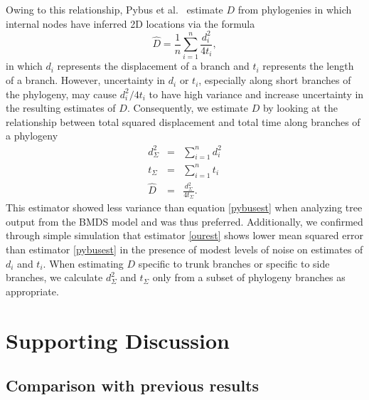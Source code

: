 \documentclass[11pt,oneside,letterpaper]{article}
\begin{document}
Owing to this relationship, Pybus et al.\ \cite{Pybus12} estimate $D$ from phylogenies in which internal nodes have inferred 2D locations via the formula
\begin{equation} \label{pybusest}
	\hat{D} = \frac{1}{n} \sum^n_{i=1} \frac{d_i^2}{4t_i},
\end{equation}
in which $d_i$ represents the displacement of a branch and $t_i$ represents the length of a branch.
However, uncertainty in $d_i$ or $t_i$, especially along short branches of the phylogeny, may cause $d_i^2/4t_i$ to have high variance and increase uncertainty in the resulting estimates of $D$.
Consequently, we estimate $D$ by looking at the relationship between total squared displacement and total time along branches of a phylogeny
\begin{eqnarray} \label{ourest}
	d^2_\Sigma &=& \sum^n_{i=1} d^2_i \nonumber \\
	t_\Sigma &=& \sum^n_{i=1} t_i \nonumber \\
	\hat{D} &=& \frac{ d^2_\Sigma }{ 4 t_\Sigma }.
\end{eqnarray}
This estimator showed less variance than equation \ref{pybusest} when analyzing tree output from the BMDS model and was thus preferred.
Additionally, we confirmed through simple simulation that estimator \ref{ourest} shows lower mean squared error than estimator \ref{pybusest} in the presence of modest levels of noise on estimates of $d_i$ and $t_i$.
When estimating $D$ specific to trunk branches or specific to side branches, we calculate $d^2_\Sigma$ and $t_\Sigma$ only from a subset of phylogeny branches as appropriate.

\section*{Supporting Discussion}

\subsection*{Comparison with previous results}
\end{document}
